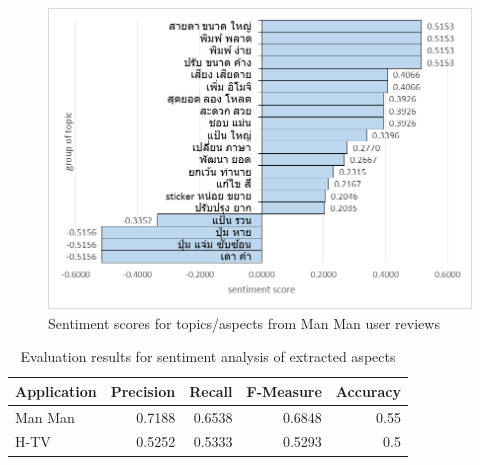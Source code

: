 \begin{figure}
	\centering
	\includegraphics[width=0.9\linewidth]{graphmanman}
	\caption{Sentiment scores for topics/aspects from Man Man user reviews}
	\label{fig:graphmanman}
\end{figure}


\begin{table}[!htbp]
	\caption{Evaluation results for sentiment analysis of extracted aspects}
	\label{table:f-measureTopic}
	\centering
	\begin{tabular}{|l|r|r|r|r|}
		\hline
		\multicolumn{1}{|c|}{\textbf{Application}} & 
		\multicolumn{1}{|c|}{\textbf{Precision}} &
		\multicolumn{1}{|c|}{\textbf{Recall}} &
		\multicolumn{1}{|c|}{\textbf{F-Measure}} &
		\multicolumn{1}{|c|}{\textbf{Accuracy}} \\
		\hline
		Man Man & 0.7188 & 0.6538 & 0.6848 & 0.55\\
		\hline
		H-TV & 0.5252 & 0.5333 & 0.5293 & 0.5\\
		\hline
	\end{tabular}
\end{table}


